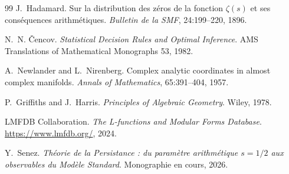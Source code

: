 \documentclass[11pt, a4paper]{article}
\numberwithin{equation}{section}
\begin{document}
\begin{thebibliography}{99}
J.~Hadamard.
\newblock Sur la distribution des zéros de la fonction $\zeta(s)$ et ses
conséquences arithmétiques.
\newblock \emph{Bulletin de la SMF}, 24:199--220, 1896.

N.~N. Čencov.
\newblock \emph{Statistical Decision Rules and Optimal Inference}.
\newblock AMS Translations of Mathematical Monographs 53, 1982.

A.~Newlander and L.~Nirenberg.
\newblock Complex analytic coordinates in almost complex manifolds.
\newblock \emph{Annals of Mathematics}, 65:391--404, 1957.

P.~Griffiths and J.~Harris.
\newblock \emph{Principles of Algebraic Geometry}.
\newblock Wiley, 1978.

LMFDB Collaboration.
\newblock \emph{The L-functions and Modular Forms Database}.
\newblock \url{https://www.lmfdb.org/}, 2024.

Y.~Senez.
\newblock \emph{Théorie de la Persistance : du paramètre arithmétique
$s = 1/2$ aux observables du Modèle Standard}.
\newblock Monographie en cours, 2026.

\end{thebibliography}
\end{document}
